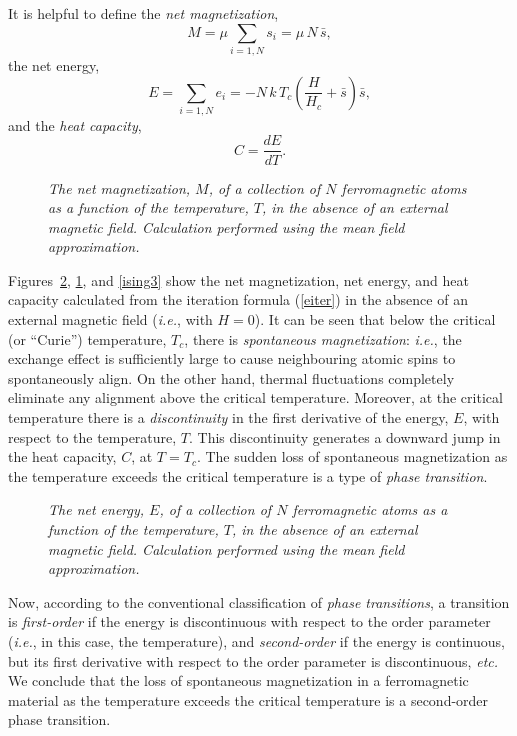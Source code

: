 It is helpful to define the {\em net magnetization},
\begin{equation}
M=\mu\sum_{i=1,N} s_i= \mu\,N\,\bar{s},
\end{equation}
the net  energy,
\begin{equation}
E=\sum_{i=1,N} e_i= -N\,k\,T_c\left(\frac{H}{H_c}+\bar{s}\right)\bar{s},
\end{equation}
and the {\em heat capacity},
\begin{equation}
C=\frac{dE}{dT}.
\end{equation}

\begin{figure}
\epsfysize=3in
\centerline{}
\caption{\em  The net magnetization, $M$, of a collection of $N$ ferromagnetic atoms as a
function of the temperature, $T$, in the absence of an external magnetic
field. Calculation performed using the mean field approximation.}\label{ising2}
\end{figure}

Figures~\ref{ising1}, \ref{ising2}, and \ref{ising3} show the net magnetization, net energy,
and heat capacity calculated from the iteration formula (\ref{eiter}) in the
absence of an external magnetic field ({\em i.e.}, with $H=0$). It
can be seen that below the critical (or ``Curie'') temperature, $T_c$, there is
{\em spontaneous magnetization}: {\em i.e.}, the exchange effect is sufficiently large
to cause neighbouring atomic spins to spontaneously align. On the other hand, 
thermal fluctuations completely eliminate any alignment above the critical temperature. Moreover, at the
critical temperature there is a
{\em discontinuity} in the first derivative of the energy, $E$, with respect to
the temperature, $T$. This discontinuity generates a downward jump
in the heat capacity, $C$, at $T=T_c$. The sudden loss of spontaneous
magnetization as the temperature exceeds the critical temperature is a type of
 {\em phase transition}.

\begin{figure}
\epsfysize=3in
\centerline{}
\caption{\em The net energy, $E$, of a collection of $N$ ferromagnetic atoms as a
function of the temperature, $T$, in the absence of an external magnetic
field. Calculation performed using the  mean field approximation.}\label{ising1}
\end{figure}

Now, according to the conventional classification of {\em phase transitions}, a
transition is {\em first-order} if the energy is discontinuous with respect
to the order parameter ({\em i.e.}, in this case, the temperature), and {\em second-order}
if the energy is continuous, but its first derivative with respect to the
order parameter is discontinuous, {\em etc.} We conclude that the loss of
spontaneous magnetization in a ferromagnetic material as the temperature
exceeds the critical temperature  is a second-order phase transition.

